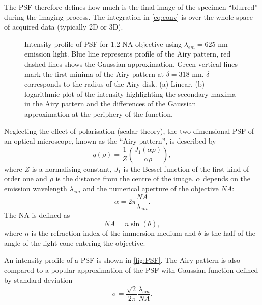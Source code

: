 The PSF therefore defines how much is the final image of the specimen ``blurred'' during the imaging process. The integration in \autoref{eq:conv} is over the whole space of acquired data (typically 2D or 3D). 

\begin{figure}[!bht]
	\centering
	\newcommand{\wf}{.48\textwidth}
	\caption{Intensity profile of PSF for 1.2 NA objective using $\lambda_{em}=625$ nm emission light. Blue line represents profile of the Airy pattern, red dashed lines shows the Gaussian approximation. Green vertical lines mark the first minima of the Airy pattern at $\delta=318$ nm. $\delta$ corresponds to the radius of the Airy disk. (a) Linear, (b) logarithmic plot of the intensity highlighting the secondary maxima in the Airy pattern and the differences of the Gaussian approximation at the periphery of the function.}
	\label{fig:PSF}
\end{figure}
%
Neglecting the effect of polarisation (scalar theory), the two-dimensional PSF of an optical microscope, known as the ``Airy pattern'', is described by
%
\begin{equation}
	q(\rho)=\frac{1}{Z}\left(\frac{J_1(\alpha \rho)}{\alpha \rho}\right),
\end{equation}
%
where $Z$ is a normalising constant, $J_1$ is the Bessel function of the first kind of order one and $\rho$ is the distance from the centre of the image. $\alpha$ depends on the emission wavelength $\lambda_{em}$ and the numerical aperture of the objective $\unit{NA}$:
%
\begin{equation}
	\alpha=2\pi\frac{\unit{NA}}{\lambda_{em}}.
\end{equation}
% 
The NA is defined as
\begin{equation}
	\unit{NA}=n\sin(\theta),
\end{equation}
%
where $n$ is the refraction index of the immersion medium and $\theta$ is the half of the angle of the light cone entering the objective.

An intensity profile of a PSF is shown in \autoref{fig:PSF}. The Airy pattern is also compared to a popular approximation of the PSF with Gaussian function \cite{Zhang2007} defined by standard deviation
%
\begin{equation}
	\sigma=\frac{\sqrt{2}}{2\pi}\frac{\lambda_{em}}{\unit{NA}}.
\end{equation}

